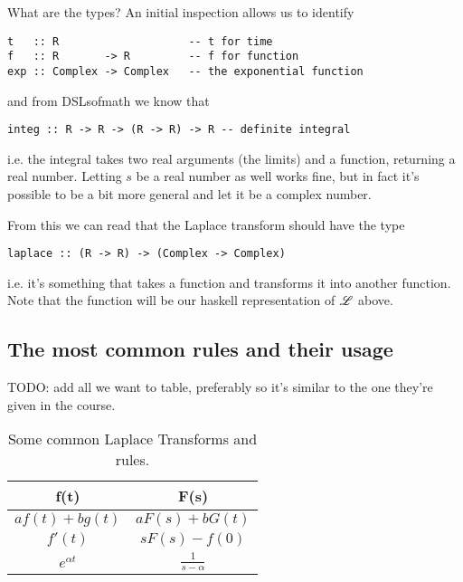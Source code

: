 What are the types? An initial inspection allows us to identify
\begin{verbatim}
t   :: R                    -- t for time
f   :: R       -> R         -- f for function
exp :: Complex -> Complex   -- the exponential function
\end{verbatim}
and from DSLsofmath we know that 
\begin{verbatim}
integ :: R -> R -> (R -> R) -> R -- definite integral 
\end{verbatim} 
i.e. the integral takes two real arguments (the limits) and a function, returning a real number. 
Letting $s$ be a real number as well works fine, but in fact it's possible to be a bit more general and let it be a complex number. 

From this we can read that the Laplace transform should have the type
\begin{verbatim}
laplace :: (R -> R) -> (Complex -> Complex) 
\end{verbatim}
i.e. it's something that takes a function and transforms it into another function. 
Note that the function  will be our haskell representation of $\mathscr{L}$ above. 

\subsection{The most common rules and their usage} 

TODO: add all we want to table, preferably so it's similar to the one they're given in the course. 
\begin{table}[h!]
    \centering
    \caption{Some common Laplace Transforms and rules.}
\begin{tabular}{|c | c|}
    \hline 
     f(t) & F(s) \\
    \hline 
     $a f(t) + b g(t)$ & $a F(s) + b G(t)$\\
     \hline 
     $f'(t)$ & $s F(s) - f(0)$ \\
     \hline 
     $e^{\alpha t}$ & $\frac{1}{s-\alpha}$\\
     \hline 
\end{tabular}
    \label{tab:laplacetrans}
\end{table}

